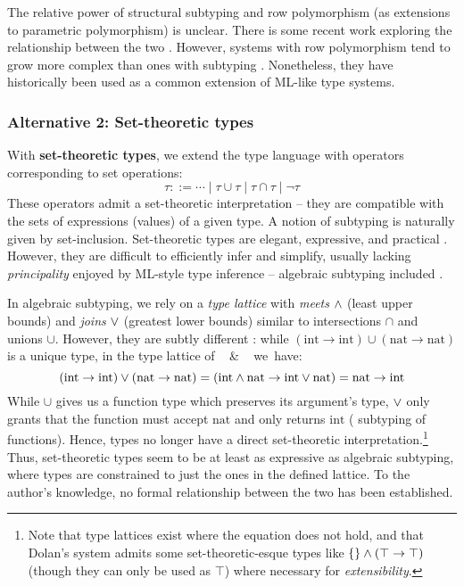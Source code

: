 The relative power of structural subtyping and row polymorphism (as extensions to parametric polymorphism) is unclear.
There is some recent work exploring the relationship between the two \cite{disjoint-polymorphism, structural-subtyping-as-parameric-polymorphism}. However, systems with row polymorphism tend to grow more complex than ones with subtyping \cite{castagna-polymorphic-variants}. Nonetheless, they have historically been used as a common extension of ML-like type systems.

\needspace{5em}
\subsubsection{Alternative 2: Set-theoretic types}

With \textbf{set-theoretic types}, we extend the type language with operators corresponding to set operations:
$$ \tau ::= \cdots \mid \tau \cup \tau \mid \tau \cap \tau \mid \lnot \tau $$
These operators admit a set-theoretic interpretation -- they are compatible with the sets of expressions (values) of a given type. 
A notion of subtyping is naturally given by set-inclusion.
Set-theoretic types are elegant, expressive, and practical \cite{set-theoretic-types-for-elixir, set-theoretic-types-for-erlang}. However, they are difficult to efficiently infer and simplify, usually lacking \emph{principality} \cite{polymorphic-set-theoretic-types, castagna-polymorphic-variants, castagna-dynamic} enjoyed by ML-style type inference -- algebraic subtyping included \cite{mlstruct, castagna-dynamic}. 

In algebraic subtyping, we rely on a \emph{type lattice} with \emph{meets} $\land$ (least upper bounds) and \emph{joins} $\lor$ (greatest lower bounds) similar to intersections $\cap$ and unions $\cup$. However, they are subtly different \cite{mlstruct}: while $(\mathrm{int} \to \mathrm{int}) \cup (\mathrm{nat} \to \mathrm{nat})$ is a unique type, in the type lattice of \mlsub{}~\cite{mlsub} \& \mlstruct{}~\cite{mlstruct} we~have: $$(\mathrm{int} \to \mathrm{int}) \lor (\mathrm{nat} \to \mathrm{nat}) = (\mathrm{int} \land \mathrm{nat} \to \mathrm{int} \lor \mathrm{nat}) = \mathrm{nat} \to \mathrm{int} $$
While $\cup$ gives us a function type which preserves its argument's type, $\lor$ only grants that the function must accept $\mathrm{nat}$ and only returns $\mathrm{int}$ (\cf{} subtyping of functions).
Hence, types no longer have a direct set-theoretic interpretation.\footnote{Note that type lattices exist where the equation does not hold, and that Dolan's system admits some set-theoretic-esque types like $\{\} \land (\top \to \top)$ (though they can only be used as $\top$) where necessary for \emph{extensibility}.} Thus, set-theoretic types seem to be at least as expressive as algebraic subtyping, where types are constrained to just the ones in the defined lattice. To the author's knowledge, no formal relationship between the two has been established.

